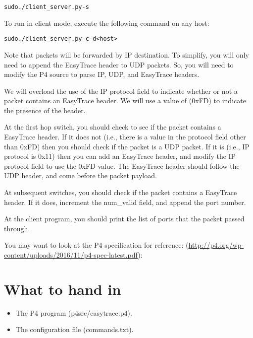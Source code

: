 \documentclass{article}
\begin{document}
 
\begin{alltt}
sudo ./client\_server.py -s
\end{alltt}

\noindent
 To run in client mode, execute the following command on any host:

\begin{alltt}
sudo ./client\_server.py -c -d <host>
\end{alltt}


\noindent
Note that packets will be forwarded by IP destination. To simplify, you will only need to append the
EasyTrace header to UDP packets. So, you will need to modify the P4 source
to parse IP, UDP, and EasyTrace headers.

We will overload the use of the IP protocol field
to indicate whether or not a packet contains an  EasyTrace header.
We will use a value of (0xFD) to indicate the presence of the header.

At the first hop switch, you should check to see if the packet
contains a EasyTrace header. If it does not (i.e., there is a value in
the protocol field other than 0xFD) then you should check if the
packet is a UDP packet. If it is (i.e., IP protocol is 0x11) then you can add an EasyTrace header, and
modify the IP protocol field to use the 0xFD value. The EasyTrace header should follow the UDP header, and
come before the packet payload.

At subsequent switches, you should check if the  packet contains a EasyTrace header. If it does,
increment the num\_valid field, and append the port number.

At the client program, you should print the list of ports that the packet passed through.

You may want to look at the P4 specification for reference:
  (\url{http://p4.org/wp-content/uploads/2016/11/p4-spec-latest.pdf}):



 \section*{What to hand in}
 \begin{itemize}
 \item The P4 program (p4src/easytrace.p4).
 \item The configuration file (commands.txt).
 \end{itemize}
\end{document}
